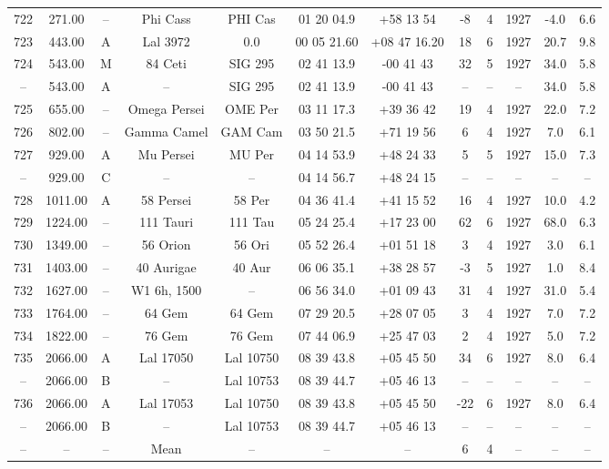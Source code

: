 \begin{table}
\begin{tabular}{cccccccccccc}
722 & 271.00 & -- & Phi Cass & PHI Cas & 01 20 04.9 & +58 13 54 & -8 & 4 & 1927 & -4.0 & 6.6 \\
723 & 443.00 & A & Lal 3972 & 0.0 & 00 05 21.60 & +08 47 16.20 & 18 & 6 & 1927 & 20.7 & 9.8 \\
724 & 543.00 & M & 84 Ceti & SIG 295 & 02 41 13.9 & -00 41 43 & 32 & 5 & 1927 & 34.0 & 5.8 \\
-- & 543.00 & A & -- & SIG 295 & 02 41 13.9 & -00 41 43 & -- & -- & -- & 34.0 & 5.8 \\
725 & 655.00 & -- & Omega Persei & OME Per & 03 11 17.3 & +39 36 42 & 19 & 4 & 1927 & 22.0 & 7.2 \\
726 & 802.00 & -- & Gamma Camel & GAM Cam & 03 50 21.5 & +71 19 56 & 6 & 4 & 1927 & 7.0 & 6.1 \\
727 & 929.00 & A & Mu Persei & MU Per & 04 14 53.9 & +48 24 33 & 5 & 5 & 1927 & 15.0 & 7.3 \\
-- & 929.00 & C & -- & -- & 04 14 56.7 & +48 24 15 & -- & -- & -- & -- & -- \\
728 & 1011.00 & A & 58 Persei & 58 Per & 04 36 41.4 & +41 15 52 & 16 & 4 & 1927 & 10.0 & 4.2 \\
729 & 1224.00 & -- & 111 Tauri & 111 Tau & 05 24 25.4 & +17 23 00 & 62 & 6 & 1927 & 68.0 & 6.3 \\
730 & 1349.00 & -- & 56 Orion & 56 Ori & 05 52 26.4 & +01 51 18 & 3 & 4 & 1927 & 3.0 & 6.1 \\
731 & 1403.00 & -- & 40 Aurigae & 40 Aur & 06 06 35.1 & +38 28 57 & -3 & 5 & 1927 & 1.0 & 8.4 \\
732 & 1627.00 & -- & W1 6h, 1500 & -- & 06 56 34.0 & +01 09 43 & 31 & 4 & 1927 & 31.0 & 5.4 \\
733 & 1764.00 & -- & 64 Gem & 64 Gem & 07 29 20.5 & +28 07 05 & 3 & 4 & 1927 & 7.0 & 7.2 \\
734 & 1822.00 & -- & 76 Gem & 76 Gem & 07 44 06.9 & +25 47 03 & 2 & 4 & 1927 & 5.0 & 7.2 \\
735 & 2066.00 & A & Lal 17050 & Lal 10750 & 08 39 43.8 & +05 45 50 & 34 & 6 & 1927 & 8.0 & 6.4 \\
-- & 2066.00 & B & -- & Lal 10753 & 08 39 44.7 & +05 46 13 & -- & -- & -- & -- & -- \\
736 & 2066.00 & A & Lal 17053 & Lal 10750 & 08 39 43.8 & +05 45 50 & -22 & 6 & 1927 & 8.0 & 6.4 \\
-- & 2066.00 & B & -- & Lal 10753 & 08 39 44.7 & +05 46 13 & -- & -- & -- & -- & -- \\
-- & -- & -- & Mean & -- & -- & -- & 6 & 4 & -- & -- & -- \\

\end{tabular}
\end{table}
